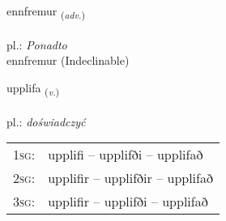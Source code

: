 \documentclass[frontgrid, backgrid]{flacards}\usepackage[]{graphicx}\usepackage[]{xcolor}
\begin{document}

\renewcommand{\flhead}{\vskip5pt \fboxsep=0pt {\small\bfseries\footnotesize Atviksorð | Adverb}}
\renewcommand{\fcfoot}{\vskip5pt \fboxsep=0pt \hspace{2pt}{\small\bfseries\footnotesize 2K}}

\renewcommand{\blhead}{\vskip5pt {\small\bfseries\footnotesize Atviksorð | Adverb }}
\renewcommand{\bcfoot}{\vskip5pt \hspace{2pt}{\small\bfseries\footnotesize 2K}}


{ennfremur \small{\textsubscript{(\textit{adv.})}} \\[1ex]
\textphonetic{[ɛnfrɛmʏr]} \\
pl.: \emph{Ponadto} \\  [2ex]
ennfremur (Indeclinable)}

\renewcommand{\flhead}{\vskip5pt \fboxsep=0pt {\small\bfseries\footnotesize Sagnorð | Verb}}
\renewcommand{\fcfoot}{\vskip5pt \fboxsep=0pt \hspace{2pt}{\small\bfseries\footnotesize 2K}}

\renewcommand{\blhead}{\vskip5pt {\small\bfseries\footnotesize Sagnorð | Verb }}
\renewcommand{\bcfoot}{\vskip5pt \hspace{2pt}{\small\bfseries\footnotesize 2K}}


{upplifa \small{\textsubscript{(\textit{v.})}} \\[1ex] %
\textphonetic{[ʏhplɪva]} \\
pl.: \emph{doświadczyć} \\  [2ex]
\renewcommand*{\arraystretch}{0.8}
\begin{tabular}{p{1cm}l}
\textsc{1sg}: & upplifi -- upplifði -- upplifað \\ 
\textsc{2sg}: & upplifir -- upplifðir -- upplifað \\ 
\textsc{3sg}: & upplifir -- upplifði -- upplifað \\ 
\end{tabular}
}
\end{document}
